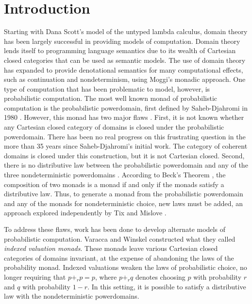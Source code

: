 

\section{Introduction}

Starting with Dana Scott's model of the untyped lambda calculus, domain theory has been largely successful in providing models of computation.  Domain theory lends itself to programming language semantics due to its wealth of Cartesian closed categories that can be used as semantic models.  The use of domain theory has expanded to provide denotational semantics for many computational effects, such as continuation and nondeterminism, using Moggi's \cite{moggi1991notions} monadic approach. One type of computation that has been problematic to model, however, is probabilistic computation.  The most well known monad of probabilistic computation is the probabilistic powerdomain, first defined by Saheb-Djahromi in 1980 \cite{saheb1980cpo}.  However, this monad has two major flaws \cite{jung1998troublesome}.  First, it is not known whether any Cartesian closed category of domains is closed under the probabilistic powerdomain.  There has been no real progress on this frustrating question in the more than 35 years since Saheb-Djahromi's initial work.  The category of coherent domains is closed under this construction, but it is not Cartesian closed.  Second, there is no distributive law between the probabilistic powerdomain and any of the three nondeterministic powerdomains \cite{varacca2003probability}.  According to Beck's Theorem \cite{beck1969distributive}, the composition of two monads is a monad if and only if the monads satisfy a distributive law.  Thus, to generate a monad from the probabilistic powerdomain and any of the monads for nondeterministic choice, new laws must be added, an approach explored independently by Tix \cite{tix1999continuous, tix2009semantic} and Mislove \cite{mislove2000nondeterminism}.  

To address these flaws, work has been done to develop alternate models of probabilistic computation.  Varacca and Winskel \cite{varacca2003probability,varacca2006distributing} constructed what they called \textit{indexed valuation monads}.  These monads leave various Cartesian closed categories of domains invariant, at the expense of abandoning the laws of the probability monad.  Indexed valuations weaken the laws of probabilistic choice, no longer requiring that $p +_r p = p$, where $p +_r q$ denotes choosing $p$ with probability $r$ and $q$ with probability $1-r$.  In this setting, it is possible to satisfy a distributive law with the nondeterministic powerdomains.

